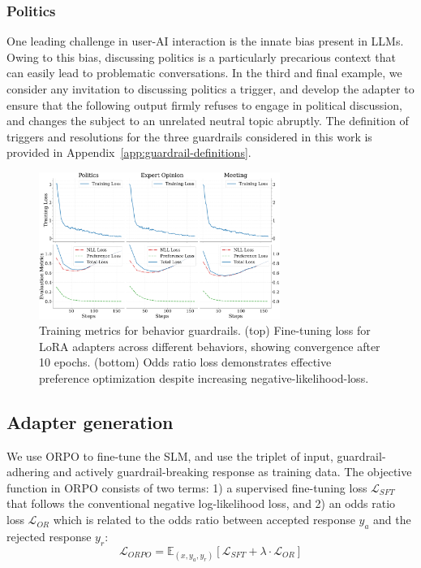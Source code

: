 \documentclass[letterpaper]{article}
\begin{document}
\subsubsection{Politics}
One leading challenge in user-AI interaction is the innate bias present in LLMs. Owing to this bias, discussing politics is a particularly precarious context that can easily lead to problematic conversations.
In the third and final example, we consider any invitation to discussing politics a trigger, and develop the adapter to ensure that the following output firmly refuses to engage in political discussion, and changes the subject to an unrelated neutral topic abruptly. 
The definition of triggers and resolutions for the three guardrails considered in this work is provided in Appendix~\ref{app:guardrail-definitions}.
\begin{figure}[h!]
	\centering
	\includegraphics[width=0.7\textwidth]{figures/trainingEvalMetricsComparison}
	\caption{Training metrics for behavior guardrails. (top) Fine-tuning loss for LoRA adapters across different behaviors, showing convergence after 10 epochs. (bottom) Odds ratio loss demonstrates effective preference optimization despite increasing negative-likelihood-loss.}
	\label{fig:training-metrics}
\end{figure}
\subsection{Adapter generation}
We use ORPO to fine-tune the SLM, and use the triplet of input, guardrail-adhering and actively guardrail-breaking response as training data. The objective function in ORPO consists of two terms: 1) a supervised fine-tuning loss $\mathcal{L}_{SFT}$ that follows the conventional negative log-likelihood loss, and 2) an odds ratio loss $\mathcal{L}_{OR}$ which is related to the odds ratio between accepted response $y_a$ and the rejected response $y_r$:
\begin{equation}
	\mathcal{L}_{ORPO} = \mathbb{E}_{(x,y_a,y_r)} [\mathcal{L}_{SFT} + \lambda \cdot \mathcal{L}_{OR}]
\end{equation}
\end{document}
